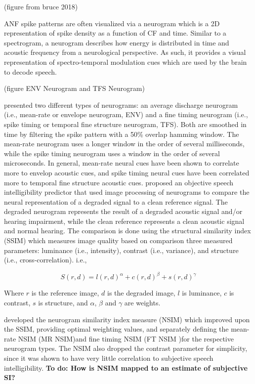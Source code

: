(figure from bruce 2018)

ANF spike patterns are often visualized via a neurogram which is a 2D representation of spike density as a function of CF and time. Similar to a spectrogram, a neurogram describes how energy is distributed in time and acoustic frequency from a neurological perspective. As such, it provides a visual representation of spectro-temporal modulation cues which are used by the brain to decode speech.

(figure ENV Neurogram and TFS Neurogram)

\cite{hines2010speech} presented two different types of neurograms: an average discharge neurogram (i.e., mean-rate or envelope neurogram, ENV) and a fine timing neurogram (i.e., spike timing or temporal fine structure neurogram, TFS). Both are smoothed in time by filtering the spike pattern with a 50\% overlap hamming window. The mean-rate neurogram uses a longer window in the order of several milliseconds, while the spike timing neurogram uses a window in the order of several microseconds. In general, mean-rate neural cues have been shown to correlate more to envelop acoustic cues, and spike timing neural cues have been correlated more to temporal fine structure acoustic cues. \cite{hines2010speech} proposed an objective speech intelligibility predictor that used image processing of neurograms to compare the neural representation of a degraded signal to a clean reference signal. The degraded neurogram represents the result of a degraded acoustic signal and/or hearing impairment, while the clean reference represents a clean acoustic signal and normal hearing. The comparison is done using the structural similarity index (SSIM) which measures image quality based on comparison three measured parameters: luminance (i.e., intensity), contrast (i.e., variance), and structure (i.e., cross-correlation). i.e.,

\[S(r,d)=l(r,d)^\alpha+c(r,d)^\beta+s(r,d)^\gamma\]

Where $r$ is the reference image, $d$ is the degraded image, $l$ is luminance, $c$ is contrast, $s$ is structure, and $\alpha$, $\beta$ and $\gamma$ are weights.

\cite{hines2012speech} developed the neurogram similarity index measure (NSIM) which improved upon the SSIM, providing optimal weighting values, and separately defining the mean-rate NSIM (MR NSIM)and fine timing NSIM (FT NSIM )for the respective neurogram types. The NSIM also dropped the contrast parameter for simplicity, since it was shown to have very little correlation to subjective speech intelligibility. \textbf{To do: How is NSIM mapped to an estimate of subjective SI?}

